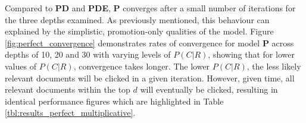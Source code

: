 Compared to \textbf{PD} and \textbf{PDE}, \textbf{P} converges after a small number of iterations for the three depths examined. As previously mentioned, this behaviour can explained by the simplistic, promotion-only qualities of the model. Figure \ref{fig:perfect_convergence} demonstrates rates of convergence for model \textbf{P} across depths of 10, 20 and 30 with varying levels of $P(C|R)$, showing that for lower values of $P(C|R)$, convergence takes longer. The lower $P(C|R)$, the less likely relevant documents will be clicked in a given iteration. However, given time, all relevant documents within the top $d$ will eventually be clicked, resulting in identical performance figures which are highlighted in Table \ref{tbl:results_perfect_multiplicative}.

\begin{figure}
	\centering
	

\end{figure}
